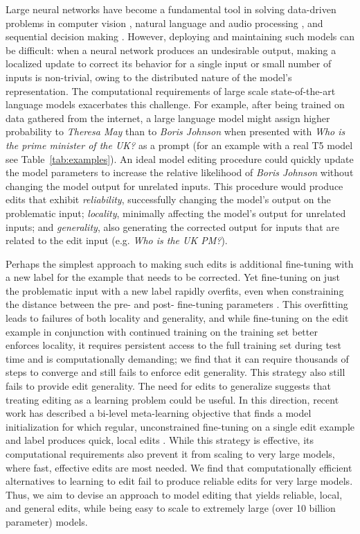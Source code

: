 \documentclass{article}
\begin{document}
Large neural networks have become a fundamental tool in solving data-driven problems in computer vision \citep{huang2017densely}, natural language and audio processing \citep{vaswani2017attention}, and sequential decision making \citep{wu2021greedy}. However, deploying and maintaining such models can be difficult: when a neural network produces an undesirable output, making a localized update to correct its behavior for a single input or small number of inputs is non-trivial, owing to the distributed nature of the model's representation. The computational requirements of large scale state-of-the-art language models exacerbates this challenge. For example, after being trained on data gathered from the internet, a large language model might assign higher probability to \textit{Theresa May} than to \textit{Boris Johnson} when presented with \textit{Who is the prime minister of the UK?} as a prompt (for an example with a real T5 model \citep{2020t5} see Table~\ref{tab:examples}). An ideal model editing procedure could quickly update the model parameters to increase the relative likelihood of \textit{Boris Johnson} without changing the model output for unrelated inputs. This procedure would produce edits that exhibit \textit{reliability}, successfully changing the model's output on the problematic input; \textit{locality}, minimally affecting the model's output for unrelated inputs; and \textit{generality}, also generating the corrected output for inputs that are related to the edit input (e.g. \textit{Who is the UK PM?}).

Perhaps the simplest approach to making such edits is additional fine-tuning with a new label for the example that needs to be corrected. Yet fine-tuning on just the problematic input with a new label rapidly overfits, even when constraining the distance between the pre- and post- fine-tuning parameters \citep{zhu2020modifying,Cao2021EditingFK}. This overfitting leads to failures of both locality and generality, and while fine-tuning on the edit example in conjunction with continued training on the training set better enforces locality, it requires persistent access to the full training set during test time and is computationally demanding; we find that it can require thousands of steps to converge and still fails to enforce edit generality. This strategy also still fails to provide edit generality. The need for edits to generalize suggests that treating editing as a learning problem could be useful.
In this direction, recent work has described a bi-level meta-learning objective that finds a model initialization for which regular, unconstrained fine-tuning on a single edit example and label produces quick, local edits \citep{Sinitsin2020Editable}. While this strategy is effective, its computational requirements also prevent it from scaling to very large models, where fast, effective edits are most needed. We find that computationally efficient alternatives to learning to edit \citep{Cao2021EditingFK} fail to produce reliable edits for very large models. Thus, we aim to devise an approach to model editing that yields reliable, local, and general edits, while being easy to scale to extremely large (over 10 billion parameter) models.
\end{document}
